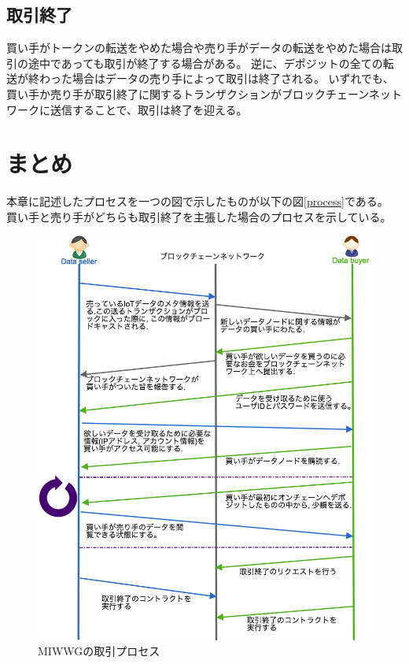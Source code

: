 \subsection{取引終了}
買い手がトークンの転送をやめた場合や売り手がデータの転送をやめた場合は取引の途中であっても取引が終了する場合がある。
逆に、デポジットの全ての転送が終わった場合はデータの売り手によって取引は終了される。
いずれでも、買い手か売り手が取引終了に関するトランザクションがブロックチェーンネットワークに送信することで、取引は終了を迎える。

\section{まとめ}
本章に記述したプロセスを一つの図で示したものが以下の図\ref{process}である。
買い手と売り手がどちらも取引終了を主張した場合のプロセスを示している。
\begin{figure}[htbp]
 \centering
  \includegraphics[width=140mm]{image/process.png}
 \caption{MIWWGの取引プロセス}
 \label{system}
\end{figure}

